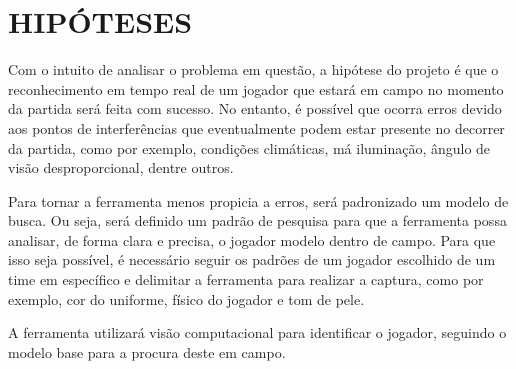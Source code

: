 \chapter{HIPÓTESES}

Com o intuito de analisar o problema em questão, a hipótese do projeto é que o reconhecimento em tempo real de um jogador que estará em campo no momento da partida será feita com sucesso. No entanto, é possível que ocorra erros devido aos pontos de interferências que eventualmente podem estar presente no decorrer da partida, como por exemplo, condições climáticas, má iluminação, ângulo de visão desproporcional, dentre outros.

Para tornar a ferramenta menos propicia a erros, será padronizado um modelo de busca. Ou seja, será definido um padrão de pesquisa para que a ferramenta possa analisar, de forma clara e precisa, o jogador modelo dentro de campo. Para que isso seja possível, é necessário seguir os padrões de um jogador escolhido de um time em específico e delimitar a ferramenta para realizar a captura, como por exemplo, cor do uniforme, físico do jogador e tom de pele.

A ferramenta utilizará visão computacional para identificar o jogador, seguindo o modelo base para a procura deste em campo.
